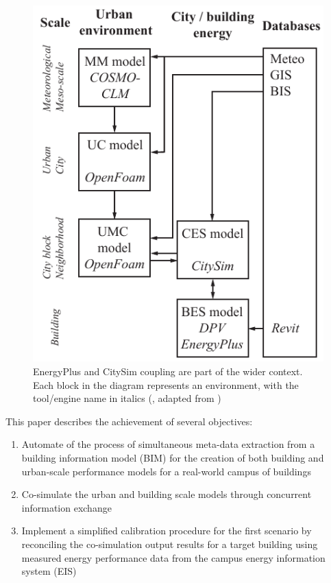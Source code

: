 \documentclass{tBPS2e}
\theoremstyle{plain}
\theoremstyle{definition}
\theoremstyle{remark}
\begin{document}
\begin{figure}[H]
\centering
\includegraphics[scale=0.7]{figures/UMEM_overview_new}
\caption{EnergyPlus and CitySim coupling are part of the wider context. Each
block in the diagram represents an environment, with the tool/engine name in
italics (\citep{thomas2014multiscale}, adapted from \citep{Dorer:2013vt})}
\label{fig:UMEM}
\end{figure}

This paper describes the achievement of several objectives:
\begin{enumerate}
  \item Automate of the process of simultaneous meta-data extraction from a
  building information model (BIM) for the creation of both building and
  urban-scale performance models for a real-world campus of buildings
  \item Co-simulate the urban and building scale models through concurrent information exchange
  \item Implement a simplified calibration procedure for the first scenario by 
  reconciling the co-simulation output results for a target building using measured energy
  performance data from the campus energy information system (EIS)
\end{enumerate}
\end{document}
